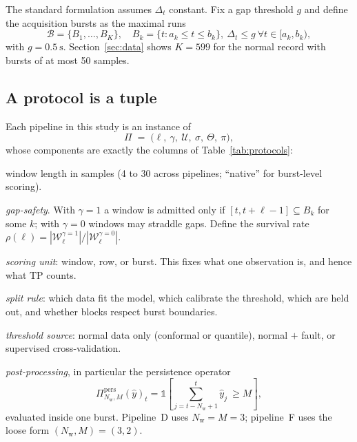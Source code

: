 \documentclass{article}
\begin{document}
The standard formulation assumes $\Delta_t$ constant. Fix a gap threshold $g$
and define the acquisition bursts as the maximal runs
\begin{equation}
\mathcal{B}=\{B_1,\dots,B_K\},\quad
B_k=\{t: a_k\le t\le b_k\},\ \Delta_t\le g\ \forall t\in[a_k,b_k),
\label{eq:burst}
\end{equation}
with $g=\SI{0.5}{\second}$. Section~\ref{sec:data} shows $K=599$ for the normal
record with bursts of at most 50 samples.

\subsection{A protocol is a tuple}
\label{sub:tuple}

Each pipeline in this study is an instance of
\begin{equation}
\Pi \;=\; \bigl(\ell,\ \gamma,\ \mathcal{U},\ \sigma,\ \Theta,\ \pi\bigr),
\label{eq:protocol}
\end{equation}
whose components are exactly the columns of Table~\ref{tab:protocols}:

\begin{description}\itemsep1pt
\item[$\ell$] window length in samples (4 to 30 across pipelines; ``native''
  for burst-level scoring).
\item[$\gamma\in\{0,1\}$] \emph{gap-safety}. With $\gamma=1$ a window is
  admitted only if $[t,t+\ell-1]\subseteq B_k$ for some $k$; with $\gamma=0$
  windows may straddle gaps. Define the survival rate
  $\rho(\ell)=|\mathcal{W}^{\gamma=1}_\ell|/|\mathcal{W}^{\gamma=0}_\ell|$.
\item[$\mathcal{U}$] \emph{scoring unit}: window, row, or burst. This fixes
  what one observation is, and hence what $\mathrm{TP}$ counts.
\item[$\sigma$] \emph{split rule}: which data fit the model, which calibrate
  the threshold, which are held out, and whether blocks respect burst
  boundaries.
\item[$\Theta$] \emph{threshold source}: normal data only (conformal or
  quantile), normal $+$ fault, or supervised cross-validation.
\item[$\pi$] \emph{post-processing}, in particular the persistence operator
\begin{equation}
\Pi^{\mathrm{pers}}_{N_{\mathrm w},M}(\hat y)_t=\mathbb{1}\!\left[\textstyle\sum_{j=t-N_{\mathrm w}+1}^{t}\hat y_j\ \ge M\right],
\label{eq:mofn}
\end{equation}
evaluated inside one burst. Pipeline~D uses $N_{\mathrm w}=M=3$; pipeline~F
uses the loose form $(N_{\mathrm w},M)=(3,2)$.
\end{description}
\end{document}
